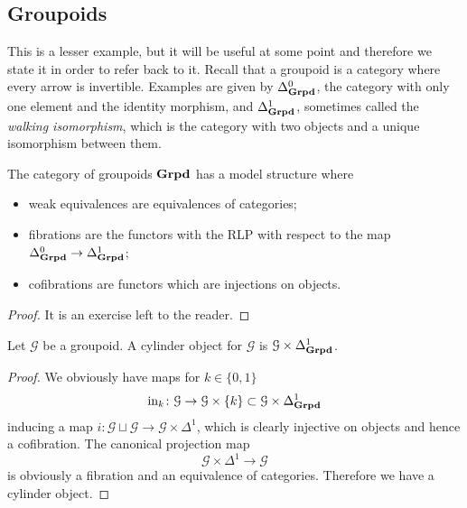 \begin{refsection}
\subsection{Groupoids} \label{model structure on groupoids}

This is a lesser example, but it will be useful at some point and therefore we state it in order to refer back to it. Recall that a groupoid is a category where every arrow is invertible. Examples are given by $\Delta^0_{\mathbf{Grpd}}$, the category with only one element and the identity morphism, and $\Delta^1_{\mathbf{Grpd}}$, sometimes called the \emph{walking isomorphism}, which is the category with two objects and a unique isomorphism between them.

\begin{thm} \label{thm model structure on groupoids}
The category of groupoids $\mathbf{Grpd}$ has a model structure where
\begin{itemize}
\item weak equivalences are equivalences of categories;
\item fibrations are the functors with the RLP with respect to the map $\Delta^0_{\mathbf{Grpd}} \to \Delta^1_{\mathbf{Grpd}}$;
\item cofibrations are functors which are injections on objects.
\end{itemize}
\end{thm} %

\begin{proof}
It is an exercise left to the reader.
\end{proof}

\begin{prop} \label{prop cylinder for groupoids}
Let $\mathcal G$ be a groupoid. A cylinder object for $\mathcal G$ is $\mathcal G \times \Delta^1_{\mathbf{Grpd}}$.
\end{prop}

\begin{proof}
We obviously have maps for $k \in \{0,1\}$
\[
\mathrm{in}_k \colon \mathcal G \to \mathcal G \times \{k\} \subset \mathcal G \times \Delta^1_{\mathbf{Grpd}}
\]
inducing a map $i \colon \mathcal G \sqcup \mathcal G \to \mathcal G \times \Delta^1$, which is clearly injective on objects and hence a cofibration. The canonical projection map
\[
\mathcal G \times \Delta^1 \to \mathcal G
\]
is obviously a fibration and an equivalence of categories. Therefore we have a cylinder object.
\end{proof}


\end{refsection}
